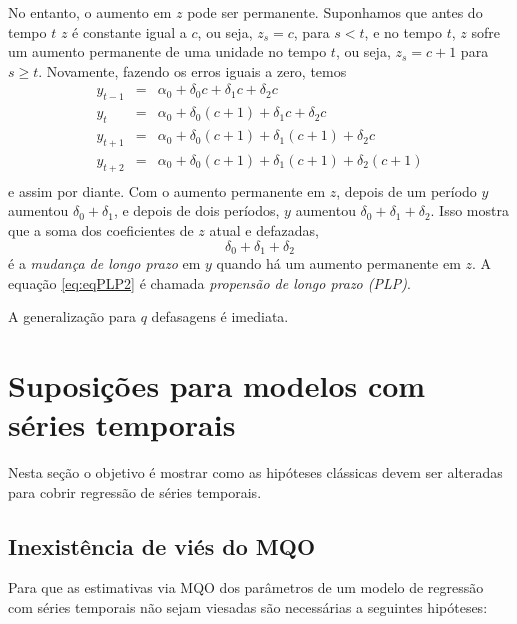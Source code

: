 \documentclass[
]{book}
\theoremstyle{definition}
\theoremstyle{definition}
\theoremstyle{definition}
\theoremstyle{remark}
\begin{document}
No entanto, o aumento em \(z\) pode ser permanente. Suponhamos que antes do tempo \(t\) \(z\) é constante igual a \(c\), ou seja, \(z_s=c\), para \(s<t\), e no tempo \(t\), \(z\) sofre um aumento permanente de uma unidade no tempo \(t\), ou seja, \(z_s=c+1\) para \(s\geq t\). Novamente, fazendo os erros iguais a zero, temos
\begin{eqnarray*}
y_{t-1}&=&\alpha_0+\delta_0c+\delta_1c+\delta_2c\\
y_{t}&=&\alpha_0+\delta_0(c+1)+\delta_1c+\delta_2c\\
y_{t+1}&=&\alpha_0+\delta_0(c+1)+\delta_1(c+1)+\delta_2c\\
y_{t+2}&=&\alpha_0+\delta_0(c+1)+\delta_1(c+1)+\delta_2(c+1)\\
\end{eqnarray*}
e assim por diante. Com o aumento permanente em \(z\), depois de um período \(y\) aumentou \(\delta_0+\delta_1\), e depois de dois períodos, \(y\) aumentou \(\delta_0+\delta_1+\delta_2\). Isso mostra que a soma dos coeficientes de \(z\) atual e defazadas,
\begin{equation}
 \delta_0+\delta_1+\delta_2
 \label{eq:eqPLP2}
\end{equation}
é a \emph{mudança de  longo prazo} em \(y\) quando há um aumento permanente em \(z\). A equação \eqref{eq:eqPLP2} é chamada \emph{propensão  de longo prazo (PLP)}.

A generalização para \(q\) defasagens é imediata.

\hypertarget{suposiuxe7uxf5es-para-modelos-com-suxe9ries-temporais}{%
\section{Suposições para modelos com séries temporais}\label{suposiuxe7uxf5es-para-modelos-com-suxe9ries-temporais}}

Nesta seção o objetivo é mostrar como as hipóteses clássicas devem ser alteradas
para cobrir regressão de séries temporais.

\hypertarget{inexistuxeancia-de-viuxe9s-do-mqo}{%
\subsection{Inexistência de viés do MQO}\label{inexistuxeancia-de-viuxe9s-do-mqo}}

Para que as estimativas via MQO dos parâmetros de um modelo de regressão com séries temporais não sejam viesadas são necessárias a seguintes hipóteses:
\end{document}
